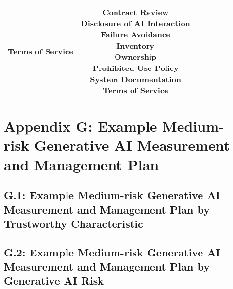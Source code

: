 \documentclass[fleqn]{article}
\begin{document}
\begin{landscape}
\begin{table}[H]
\begin{tabular}{|c|c|c|c|c|}
{			\textbullet\hspace{3pt} Terms of Service\\ 	
		} 
		& \makecell[l]{ 	
			\textbullet\hspace{3pt} Contract Review\\ 	
			\textbullet\hspace{3pt} Disclosure of AI Interaction\\ 	
			\textbullet\hspace{3pt} Failure Avoidance\\ 	
			\textbullet\hspace{3pt} Inventory\\ 	
			\textbullet\hspace{3pt} Ownership\\ 	
			\textbullet\hspace{3pt} Prohibited Use Policy\\ 	
			\textbullet\hspace{3pt} System Documentation\\ 	
			\textbullet\hspace{3pt} Terms of Service	\\ 	
		}\\
		\hline
	\end{tabular}
	\label{table:low_risk_plan_by_gai_risk_cont3}
\end{table}

\vfill
\raisebox{-10pt}{\makebox[\linewidth]{\thepage}}
\end{landscape}


\section*{Appendix G: Example Medium-risk Generative AI Measurement and Management Plan}\label{sec:appndxg}

\subsection*{G.1: Example Medium-risk Generative AI Measurement and Management Plan by Trustworthy Characteristic}\label{appdxg1}

\subsection*{G.2: Example Medium-risk Generative AI Measurement and Management Plan by Generative AI Risk}\label{appdxg2}
\end{document}
